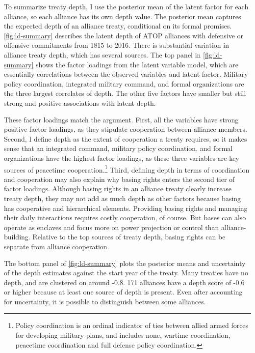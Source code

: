 \documentclass[12pt]{article}
\begin{document}
To summarize treaty depth, I use the posterior mean of the latent factor for each alliance, so each alliance has its own depth value.
The posterior mean captures the expected depth of an alliance treaty, conditional on its formal promises. 
\autoref{fig:ld-summary} describes the latent depth of ATOP alliances with defensive or offensive commitments from 1815 to 2016.
There is substantial variation in alliance treaty depth, which has several sources. 
The top panel in \autoref{fig:ld-summary} shows the factor loadings from the latent variable model, which are essentially correlations between the observed variables and latent factor. 
Military policy coordination, integrated military command, and formal organizations are the three largest correlates of depth. 
The other five factors have smaller but still strong and positive associations with latent depth. 


These factor loadings match the argument. 
First, all the variables have strong positive factor loadings, as they stipulate cooperation between alliance members. 
Second, I define depth as the extent of cooperation a treaty requires, so it makes sense that an integrated command, military policy coordination, and formal organizations have the highest factor loadings, as these three variables are key sources of peacetime cooperation.\footnote{Policy coordination is an ordinal indicator of ties between allied armed forces for developing military plans, and includes none, wartime coordination, peacetime coordination and full defense policy coordination.}
Third, defining depth in terms of coordination and cooperation may also explain why basing rights enters the second tier of factor loadings. 
Although basing rights in an alliance treaty clearly increase treaty depth, they may not add as much depth as other factors because basing has cooperative and hierarchical elements. 
Providing basing rights and managing their daily interactions requires costly cooperation, of course. 
But bases can also operate as enclaves and focus more on power projection or control than alliance-building.  
Relative to the top sources of treaty depth, basing rights can be separate from alliance cooperation. 


The bottom panel of \autoref{fig:ld-summary} plots the posterior means and uncertainty of the depth estimates against the start year of the treaty. 
Many treaties have no depth, and are clustered on around -0.8.  
171 alliances have a depth score of -0.6 or higher because at least one source of depth is present. 
Even after accounting for uncertainty, it is possible to distinguish between some alliances. 
\end{document}
